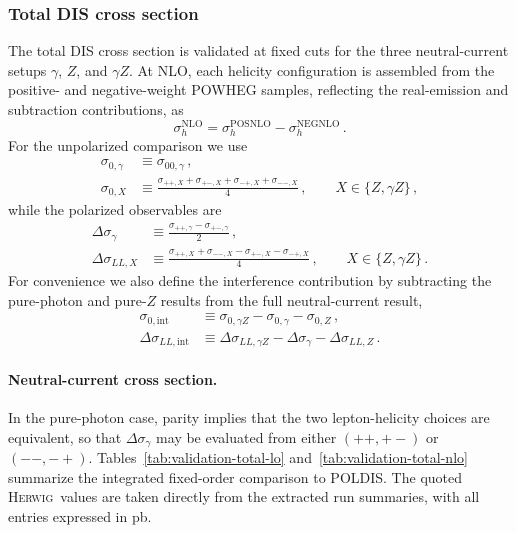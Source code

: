 \documentclass[a4paper,11pt]{article}
\newcommand{\Herwig}{\textsc{Herwig}}
\newcommand{\POLDIS}{\textsc{POLDIS}}
\begin{document}
\subsubsection{Total DIS cross section}
The total DIS cross section is validated at fixed cuts for the three neutral-current
setups $\gamma$, $Z$, and $\gamma Z$.  At NLO, each helicity configuration is assembled from
the positive- and negative-weight POWHEG samples, reflecting the real-emission and subtraction contributions, as
\begin{equation}
  \sigma_h^{\mathrm{NLO}}
  =
  \sigma_h^{\mathrm{POSNLO}}
  -
  \sigma_h^{\mathrm{NEGNLO}}\,.
\end{equation}
For the unpolarized comparison we use
\begin{align}
  \sigma_{0,\gamma} &\equiv \sigma_{00,\gamma}\,,
  \\
  \sigma_{0,X} &\equiv
  \frac{\sigma_{++,X}+\sigma_{+-,X}+\sigma_{-+,X}+\sigma_{--,X}}{4}\,,
  \qquad X\in\{Z,\gamma Z\}\,,
\end{align}
while the polarized observables are
\begin{align}
  \Delta\sigma_{\gamma}
  &\equiv
  \frac{\sigma_{++,\gamma}-\sigma_{+-,\gamma}}{2}\,,
  \\
  \Delta\sigma_{LL,X}
  &\equiv
  \frac{\sigma_{++,X}+\sigma_{--,X}-\sigma_{+-,X}-\sigma_{-+,X}}{4}\,,
  \qquad X\in\{Z,\gamma Z\}\,.
\end{align}
For convenience we also define the interference contribution by subtracting the
pure-photon and pure-$Z$ results from the full neutral-current result,
\begin{align}
  \sigma_{0,\mathrm{int}}
  &\equiv
  \sigma_{0,\gamma Z}-\sigma_{0,\gamma}-\sigma_{0,Z}\,,
  \\
  \Delta\sigma_{LL,\mathrm{int}}
  &\equiv
  \Delta\sigma_{LL,\gamma Z}-\Delta\sigma_{\gamma}-\Delta\sigma_{LL,Z}\,.
\end{align}
\paragraph{Neutral-current cross section.}
In the pure-photon case, parity implies that the two lepton-helicity choices
are equivalent, so that $\Delta\sigma_\gamma$ may be evaluated from either
$(++, +-)$ or $(--,-+)$. Tables~\ref{tab:validation-total-lo}
and~\ref{tab:validation-total-nlo} summarize the integrated fixed-order
comparison to \POLDIS. The quoted \Herwig\ values are taken
directly from the extracted run summaries, with all entries expressed in pb.
\end{document}
